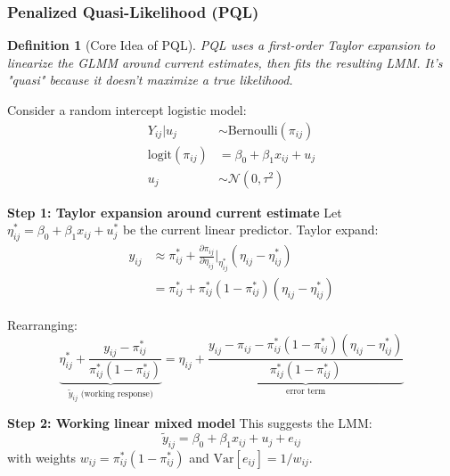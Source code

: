 \documentclass{article}
\newtheorem{definition}{Definition}
\begin{document}
\subsubsection{Penalized Quasi-Likelihood (PQL)}

\begin{definition}[Core Idea of PQL]
PQL uses a first-order Taylor expansion to linearize the GLMM around current estimates, then fits the resulting LMM. It's "quasi" because it doesn't maximize a true likelihood.
\end{definition}

\begin{example}
Consider a random intercept logistic model:
\begin{align}
Y_{ij}|u_j &\sim \text{Bernoulli}(\pi_{ij}) \\
\text{logit}(\pi_{ij}) &= \beta_0 + \beta_1 x_{ij} + u_j \\
u_j &\sim \mathcal{N}(0, \tau^2)
\end{align}

\textbf{Step 1: Taylor expansion around current estimate}
Let $\eta_{ij}^* = \beta_0 + \beta_1 x_{ij} + u_j^*$ be the current linear predictor. Taylor expand:
\begin{align}
y_{ij} &\approx \pi_{ij}^* + \frac{\partial \pi_{ij}}{\partial \eta_{ij}}\bigg|_{\eta_{ij}^*} (\eta_{ij} - \eta_{ij}^*) \\
&= \pi_{ij}^* + \pi_{ij}^*(1-\pi_{ij}^*)(\eta_{ij} - \eta_{ij}^*)
\end{align}

Rearranging:
\begin{equation}
\underbrace{\eta_{ij}^* + \frac{y_{ij} - \pi_{ij}^*}{\pi_{ij}^*(1-\pi_{ij}^*)}}_{\tilde{y}_{ij} \text{ (working response)}} = \eta_{ij} + \underbrace{\frac{y_{ij} - \pi_{ij} - \pi_{ij}^*(1-\pi_{ij}^*)(\eta_{ij} - \eta_{ij}^*)}{\pi_{ij}^*(1-\pi_{ij}^*)}}_{\text{error term}}
\end{equation}

\textbf{Step 2: Working linear mixed model}
This suggests the LMM:
\begin{equation}
\tilde{y}_{ij} = \beta_0 + \beta_1 x_{ij} + u_j + e_{ij}
\end{equation}
with weights $w_{ij} = \pi_{ij}^*(1-\pi_{ij}^*)$ and $\text{Var}[e_{ij}] = 1/w_{ij}$.
\end{example}
\end{document}
